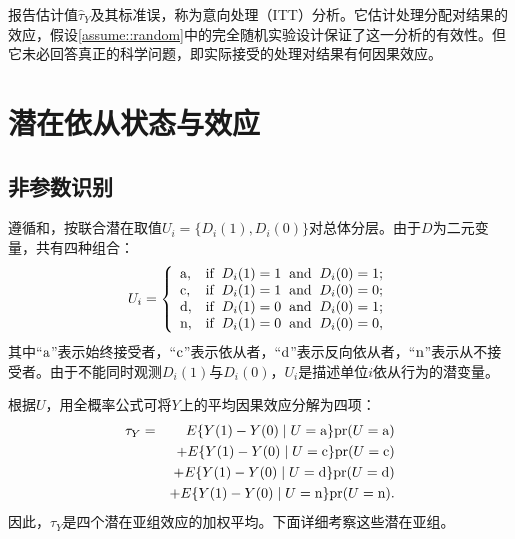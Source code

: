 报告估计值$\hat{\tau}_Y$及其标准误，称为意向处理（ITT）分析。它估计处理分配对结果的效应，假设\ref{assume::random}中的完全随机实验设计保证了这一分析的有效性。但它未必回答真正的科学问题，即实际接受的处理对结果有何因果效应。




\section{潜在依从状态与效应}

\subsection{非参数识别}


遵循\citet{imbens1994identification}和\citet{angrist1996identification}，按联合潜在取值$U_i = \{  D_i(1), D_i(0) \}$对总体分层。由于$D$为二元变量，共有四种组合：
\begin{eqnarray*}
U_i=\left \{ \begin{array} {ll}
\textup{a}  , & \text{if} \hspace{2mm} D_i(1)=1 \hspace{2mm} \text{and} \hspace{2mm} D_i(0)=1; \\
\textup{c}  , & \text{if} \hspace{2mm} D_i(1)=1 \hspace{2mm} \text{and} \hspace{2mm} D_i(0)=0; \\
\textup{d}  ,& \text{if} \hspace{2mm} D_i(1)=0 \hspace{2mm} \text{and} \hspace{2mm} D_i(0)=1; \\
\textup{n}  , & \text{if} \hspace{2mm} D_i(1)=0 \hspace{2mm} \text{and} \hspace{2mm} D_i(0)=0,
\end{array}
\right.  
\end{eqnarray*}
其中“$\textup{a}$”表示始终接受者，“$\textup{c}$”表示依从者，“$\textup{d}$”表示反向依从者，“$\textup{n}$”表示从不接受者。由于不能同时观测$D_i(1)$与$D_i(0)$，$U_i$是描述单位$i$依从行为的潜变量。 


根据$U$，用全概率公式可将$Y$上的平均因果效应分解为四项：
\begin{eqnarray} 
\tau_Y &=& E\{ Y(1) - Y(0) \mid U=\textup{a}  \} \textup{pr}(U = \textup{a} )  \nonumber  \\
&&+ E\{ Y(1) - Y(0) \mid U=\textup{c}   \} \textup{pr}(U = \textup{c} ) \nonumber  \\
&&+ E\{ Y(1) - Y(0) \mid U=\textup{d}  \} \textup{pr}(U = \textup{d} ) \nonumber  \\
&&+ E\{ Y(1) - Y(0) \mid U=\textup{n}  \} \textup{pr}(U = \textup{n} ) . \label{eq::decompose-ate-y-cace}
\end{eqnarray}
因此，$\tau_Y $是四个潜在亚组效应的加权平均。下面详细考察这些潜在亚组。 



